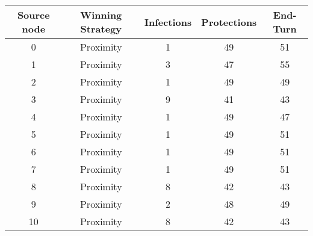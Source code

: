 \documentclass[results.tex]{subfiles}
\begin{document}
    \begin{center}
        \begin{tabular}{| c || c | c | c | c |}
            \hline
            {\bfseries Source node} & {\bfseries Winning Strategy} & {\bfseries Infections} & {\bfseries Protections}
            & {\bfseries End-Turn}
            \\  %
            \hline\hline
            0                       & Proximity                    & 1                      & 49                      & 51                   \\
            \hline
            1                       & Proximity                    & 3                      & 47                      & 55                   \\
            \hline
            2                       & Proximity                    & 1                      & 49                      & 49                   \\
            \hline
            3                       & Proximity                    & 9                      & 41                      & 43                   \\
            \hline
            4                       & Proximity                    & 1                      & 49                      & 47                   \\
            \hline
            5                       & Proximity                    & 1                      & 49                      & 51                   \\
            \hline
            6                       & Proximity                    & 1                      & 49                      & 51                   \\
            \hline
            7                       & Proximity                    & 1                      & 49                      & 51                   \\
            \hline
            8                       & Proximity                    & 8                      & 42                      & 43                   \\
            \hline
            9                       & Proximity                    & 2                      & 48                      & 49                   \\
            \hline
            10                      & Proximity                    & 8                      & 42                      & 43                   \\

\end{tabular}
\end{center}
\end{document}
